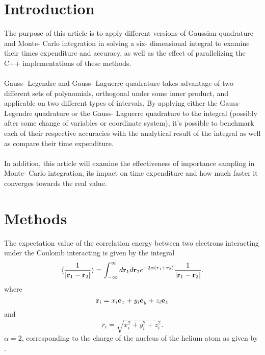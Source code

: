 \documentclass[10pt,a4paper]{article}
\begin{document}
\section{Introduction} 
The purpose of this article is to apply different versions of Gaussian quadrature and Monte- Carlo integration in solving a six- dimensional integral to examine their times expenditure and accuracy, as well as the effect of parallelizing the C++ implementations of these methods.\\\\Gauss- Legendre and Gauss- Laguerre quadrature takes advantage of two different sets of polynomials, orthogonal under some inner product, and applicable on two different types of intervals. By applying either the Gauss- Legendre quadrature or the Gauss- Laguerre quadrature to the integral (possibly after some change of variables or coordinate system), it's possible to benchmark each of their respective accuracies with the analytical result of the integral as well as compare their time expenditure.\\\\In addition, this article will examine the effectiveness of importance sampling in Monte- Carlo integration, its impact on time expenditure and how much faster it converges towards the real value.
\section{Methods}
The expectation value of the correlation energy between two electrons interacting under the Coulomb interacting is given by the integral
\begin{equation}\label{eq:correlationenergy}
   \langle \frac{1}{|{\bf r}_1-{\bf r}_2|} \rangle =
   \int_{-\infty}^{\infty} d{\bf r}_1d{\bf r}_2  e^{-2\alpha (r_1+r_2)}\frac{1}{|{\bf r}_1-{\bf r}_2|}.
\end{equation}
where 
$$
   {\bf r}_i =  x_i {\bf e}_x + y_i {\bf e}_y +z_i {\bf e}_z
$$
and
$$
r_i = \sqrt{x_i^2+y_i^2+z_i^2}.
$$
$\alpha = 2$, corresponding to the charge of the nucleus of the helium atom as given by \cite{Problem_set_3}.
\end{document}
